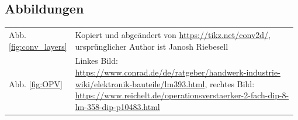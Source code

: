 \documentclass[10pt]{article}
\begin{document}
\subsection{Abbildungen}
\begin{table}[h!]
    \renewcommand*{\arraystretch}{1.2}
    \centering
    {
    \setlength{\tabcolsep}{0pt}
    \begin{tabular}{p{0.08\linewidth}p{0.9\linewidth}}
        Abb. \ref{fig:conv_layers} %
        & Kopiert und abgeändert von \href{https://tikz.net/conv2d/}{https://tikz.net/conv2d/}, ursprünglicher Author ist Janosh Riebesell  \\
        Abb. \ref{fig:OPV} %
        & Linkes Bild: \href{https://www.conrad.de/de/ratgeber/handwerk-industrie-wiki/elektronik-bauteile/lm393.html}{https://www.conrad.de/de/ratgeber/handwerk-industrie-wiki/elektronik-bauteile/lm393.html}, rechtes Bild: \href{https://www.reichelt.de/operationsverstaerker-2-fach-dip-8-lm-358-dip-p10483.html}{https://www.reichelt.de/operationsverstaerker-2-fach-dip-8-lm-358-dip-p10483.html} \\
    \end{tabular}
    }
    \label{tab:my_label}
\end{table}
\printbibliography[title={Literatur}, keyword={Literatur}]
\printbibliography[title={Anderes}, notkeyword={Literatur}]
\end{document}
